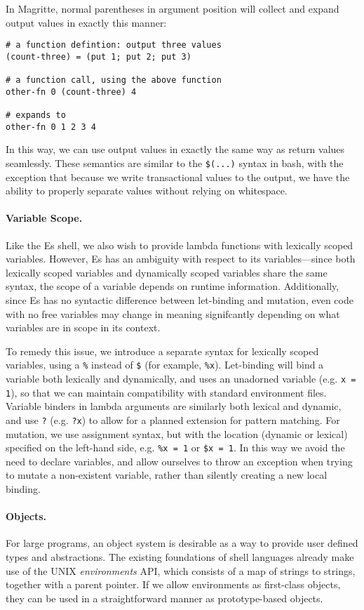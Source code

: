 \documentclass[english,preprint,JIP]{ipsj}
\begin{document}
In Magritte, normal parentheses in argument position will collect and expand output values in exactly this manner:
\begin{lstlisting}
# a function defintion: output three values
(count-three) = (put 1; put 2; put 3)

# a function call, using the above function
other-fn 0 (count-three) 4

# expands to
other-fn 0 1 2 3 4
\end{lstlisting}

In this way, we can use output values in exactly the same way as return values seamlessly. These semantics are similar to the \verb/$(...)/ syntax in bash, with the exception that because we write transactional values to the output, we have the ability to properly separate values without relying on whitespace.

\paragraph{Variable Scope.}
Like the Es shell\cite{haahr}, we also wish to provide lambda functions with lexically scoped variables. However, Es has an ambiguity with respect to its variables---since both lexically scoped variables and dynamically scoped variables share the same syntax, the scope of a variable depends on runtime information. Additionally, since Es has no syntactic difference between let-binding and mutation, even code with no free variables may change in meaning signifcantly depending on what variables are in scope in its context.

To remedy this issue, we introduce a separate syntax for lexically scoped variables, using a \verb/%/ instead of \verb/$/ (for example, \verb/%x/). Let-binding will bind a variable both lexically and dynamically, and uses an unadorned variable (e.g. \verb/x = 1/), so that we can maintain compatibility with standard environment files. Variable binders in lambda arguments are similarly both lexical and dynamic, and use \verb/?/ (e.g. \verb/?x/) to allow for a planned extension for pattern matching. For mutation, we use assignment syntax, but with the location (dynamic or lexical) specified on the left-hand side, e.g. \verb/%x = 1/ or \verb/$x = 1/. In this way we avoid the need to declare variables, and allow ourselves to throw an exception when trying to mutate a non-existent variable, rather than silently creating a new local binding.

\paragraph{Objects.}
For large programs, an object system is desirable as a way to provide user defined types and abstractions. The existing foundations of shell languages already make use of the UNIX \emph{environments} API, which consists of a map of strings to strings, together with a parent pointer. If we allow environments as first-class objects, they can be used in a straightforward manner as prototype-based objects.
\end{document}
